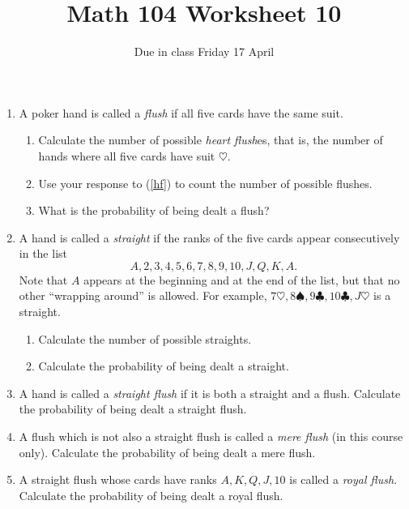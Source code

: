 \documentclass[12pt]{article}
\author{}\date{Due in class Friday 17 April}
\title{Math 104 Worksheet 10}\author{}
\begin{document}
\maketitle
\thispagestyle{empty}
\begin{enumerate}
\item A poker hand is called a {\em flush} if all five cards
have the same suit.
\begin{enumerate}
\item\label{hf} Calculate the number of possible {\em heart flush}es,
that is, the number of hands where all five cards have suit $\heartsuit$.
\vspace{1cm}
\item Use your response to (\ref{hf}) to count the number of
possible flushes.
\vspace{1cm}
\item What is the probability of being dealt a flush?
\vspace{1cm}
\end{enumerate}
\item A hand is called a {\em straight} if the ranks of the five
cards appear consecutively in the list
\[A,2,3,4,5,6,7,8,9,10,J,Q,K,A.\]
Note that $A$ appears at the beginning and at the end of the list, but
that no other ``wrapping around'' is allowed.
For example, $7\heartsuit,8\spadesuit,9\clubsuit,10\clubsuit,J\heartsuit$
is a straight.
\begin{enumerate}
\item Calculate the number of possible straights.
\vspace{1cm}
\item Calculate the probability of being dealt a straight.
\vspace{1cm}
\end{enumerate}

\item A hand is called a {\em straight flush} if it is both
a straight and a flush. Calculate the probability of being dealt
a straight flush.
\vspace{1cm}
\item A flush which is not also a straight flush is called a {\em mere flush}
(in this course only).
Calculate the probability of being dealt a mere flush.
\vspace{1cm}
\item A straight flush whose cards have ranks $A,K,Q,J,10$ is called
a {\em royal flush}. 
Calculate the probability of being dealt a royal flush.
\end{enumerate}
\end{document}
